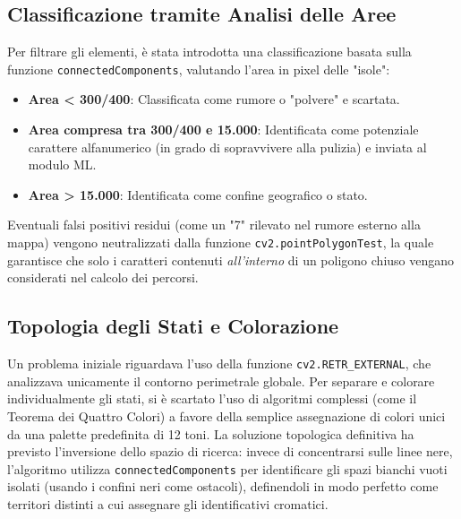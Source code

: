 \documentclass[12pt,a4paper]{article}
\begin{document}
	\subsection{Classificazione tramite Analisi delle Aree}
	Per filtrare gli elementi, è stata introdotta una classificazione basata sulla funzione \texttt{connectedComponents}, valutando l'area in pixel delle "isole":
	\begin{itemize}
		\item \textbf{Area < 300/400}: Classificata come rumore o "polvere" e scartata.
		\item \textbf{Area compresa tra 300/400 e 15.000}: Identificata come potenziale carattere alfanumerico (in grado di sopravvivere alla pulizia) e inviata al modulo ML.
		\item \textbf{Area > 15.000}: Identificata come confine geografico o stato.
	\end{itemize}
	Eventuali falsi positivi residui (come un "7" rilevato nel rumore esterno alla mappa) vengono neutralizzati dalla funzione \texttt{cv2.pointPolygonTest}, la quale garantisce che solo i caratteri contenuti \textit{all'interno} di un poligono chiuso vengano considerati nel calcolo dei percorsi.

	\subsection{Topologia degli Stati e Colorazione}
	Un problema iniziale riguardava l'uso della funzione \texttt{cv2.RETR\_EXTERNAL}, che analizzava unicamente il contorno perimetrale globale.
	Per separare e colorare individualmente gli stati, si è scartato l'uso di algoritmi complessi (come il Teorema dei Quattro Colori) a favore della semplice assegnazione di colori unici da una palette predefinita di 12 toni.
	La soluzione topologica definitiva ha previsto l'inversione dello spazio di ricerca: invece di concentrarsi sulle linee nere, l'algoritmo utilizza \texttt{connectedComponents} per identificare gli spazi bianchi vuoti isolati (usando i confini neri come ostacoli), definendoli in modo perfetto come territori distinti a cui assegnare gli identificativi cromatici.
\end{document}
